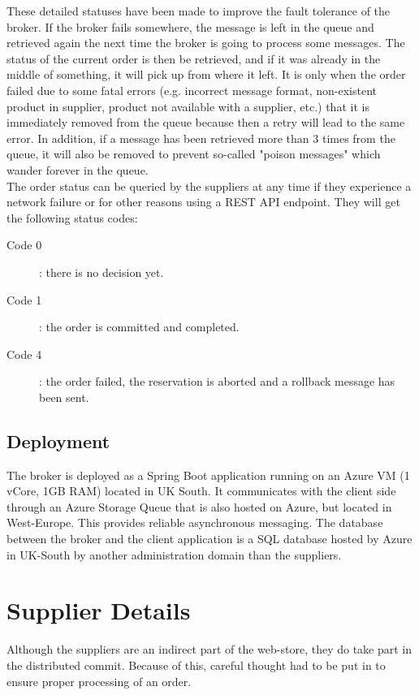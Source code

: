 \documentclass[10pt,a4paper,kul]{kulakarticle} %
\begin{document}
		\noindent These detailed statuses have been made to improve the fault tolerance of the broker. If the broker fails somewhere, the message is left in the queue and retrieved again the next time the broker is going to process some messages. The status of the current order is then be retrieved, and if it was already in the middle of something, it will pick up from where it left. It is only when the order failed due to some fatal errors (e.g. incorrect message format, non-existent product in supplier, product not available with a supplier, etc.) that it is immediately removed from the queue because then a retry will lead to the same error. In addition, if a message has been retrieved more than 3 times from the queue, it will also be removed to prevent so-called "poison messages" which wander forever in the queue.\\
		\newline
		The order status can be queried by the suppliers at any time if they experience a network failure or for other reasons using a REST API endpoint. They will get the following status codes:
		 
		 \begin{description}
		 	\item[Code 0]: there is no decision yet.
		 	\item[Code 1]: the order is committed and completed.
		 	\item[Code 4]: the order failed, the reservation is aborted and a rollback message has been sent.
		 \end{description}
		
		\subsection{Deployment}
		The broker is deployed as a Spring Boot application running on an Azure VM (1 vCore, 1GB RAM) located in UK South. It communicates with the client side through an Azure Storage Queue that is also hosted on Azure, but located in West-Europe. This provides reliable asynchronous messaging. The database between the broker and the client application is a SQL database hosted by Azure in UK-South by another administration domain than the suppliers.
	
	\section{Supplier Details}
		Although the suppliers are an indirect part of the web-store, they do take part in the distributed commit. Because of this, careful thought had to be put in to ensure proper processing of an order. 
\end{document}
